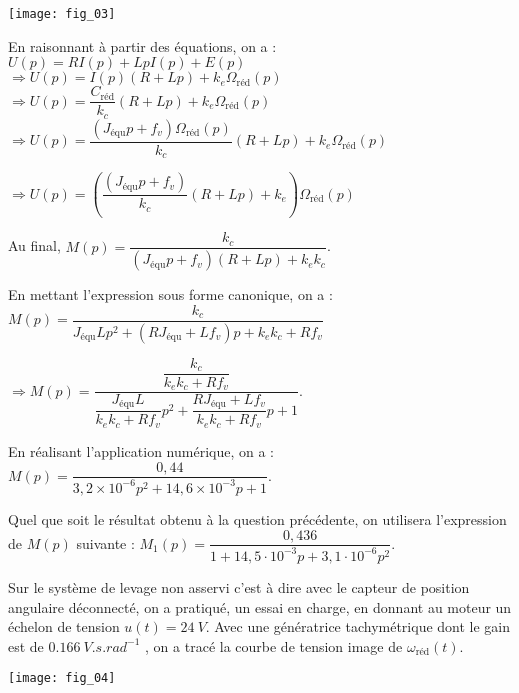 \else
\fi
\ifprof
\else
\begin{center}
\texttt{[image: fig\_03]}
\end{center}
\fi

\ifprof
\begin{corrige}
En raisonnant à partir des équations, on a : 
$U(p) = R I(p) + LpI(p)+ E(p)$ 
$\Rightarrow U(p) = I(p) \left(R + Lp\right)+ k_e  \Omega_{\text{réd}}(p)$
$\Rightarrow U(p) = \dfrac{C_{\text{réd}}}{k_c} \left(R + Lp\right)+ k_e  \Omega_{\text{réd}}(p)$
$\Rightarrow U(p) = \dfrac{\left( J_{\text{équ}}  p +f_v\right)\Omega_{\text{réd}}(p)}{k_c} \left(R + Lp\right)+ k_e  \Omega_{\text{réd}}(p)$

$\Rightarrow U(p) = \left(\dfrac{\left( J_{\text{équ}}  p +f_v\right)}{k_c} \left(R + Lp\right)+ k_e \right) \Omega_{\text{réd}}(p)$

Au final, $M(p)=\dfrac{k_c}{ \left( J_{\text{équ}}  p +f_v\right) \left(R + Lp\right)+ k_e k_c}$.

En mettant l'expression sous forme canonique, on a :
$M(p)=\dfrac{k_c}{   J_{\text{équ}}   Lp^2 +\left( RJ_{\text{équ}}    +  L f_v\right) p + k_e k_c+Rf_v}$

$\Rightarrow  M(p)=\dfrac{\dfrac{k_c}{k_e k_c+Rf_v}}{  \dfrac{ J_{\text{équ}}   L}{k_e k_c+Rf_v}p^2 +\dfrac{ RJ_{\text{équ}}    +  L f_v}{k_e k_c+Rf_v}p +1 }$.

En réalisant l'application numérique, on a : 
$M(p)=\dfrac{0,44}{  3,2\times 10^{-6} p^2 +14,6\times 10^{-3}p +1 }$.

\end{corrige}
\else
\fi

\ifprof
\else
Quel que soit le résultat obtenu à la question précédente, on utilisera l’expression de $M(p)$ suivante : $M_1(p)=\dfrac{0,436}{1+14,5\cdot 10^{-3}p+3,1\cdot 10^{-6}p^2}$. 

Sur le système de levage non asservi c’est à dire avec le capteur de position angulaire déconnecté, on a pratiqué, un essai en charge, en donnant au moteur un échelon de tension $u(t) = \SI{24}{V}$. 
Avec une génératrice tachymétrique dont le gain est de $\SI{0,166}{V.s.rad^{-1}}$ , on a tracé la courbe de tension image de $\omega_{\text{réd}}(t)$.  

\begin{marginfigure}
\texttt{[image: fig\_04]}
\end{marginfigure}


